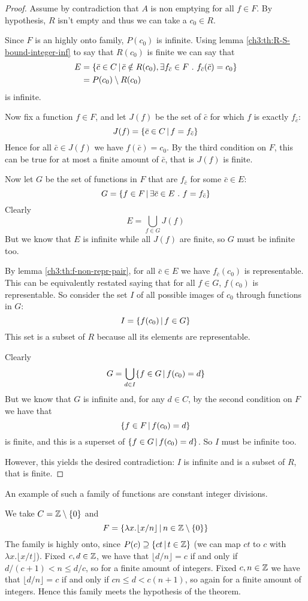 \begin{proof}
	Assume by contradiction that $A$ is non emptying for all $f \in F$. By hypothesis, $R$ isn't empty and thus we can take a $c_0 \in R$.
	
	Since $F$ is an highly onto family, $P(c_0)$ is infinite. Using lemma \ref{ch3:th:R-S-bound-integer-inf} to say that $R(c_0)$ is finite we can say that
	\begin{align*}
		E &= \{ \bar{c} \in C \,\vert\, \bar{c} \notin R(c_0), \exists f_{\bar{c}} \in F\ .\ f_{\bar{c}}(\bar{c}) = c_0 \} \\
		&= P(c_0) \setminus R(c_0)
	\end{align*}
	is infinite.

	Now fix a function $f \in F$, and let $J(f)$ be the set of $\bar{c}$ for which $f$ is exactly $f_{\bar{c}}$:
	\[
	J(f) = \{ \bar{c} \in C \,\vert\, f = f_{\bar{c}} \}
	\]
	Hence for all $\bar{c} \in J(f)$ we have $f(\bar{c}) = c_0$. By the third condition on $F$, this can be true for at most a finite amount of $\bar{c}$, that is $J(f)$ is finite.

	Now let $G$ be the set of functions in $F$ that are $f_{\bar{c}}$ for some $\bar{c} \in E$:
	\[
	G = \{ f \in F \,\vert\, \exists \bar{c} \in E\ .\ f = f_{\bar{c}} \}
	\]
	Clearly
	\[
	E = \bigcup\limits_{f \in G} J(f)
	\]
	But we know that $E$ is infinite while all $J(f)$ are finite, so $G$ must be infinite too.

	By lemma \ref{ch3:th:f-non-repr-pair}, for all $\bar{c} \in E$ we have $f_{\bar{c}}(c_0)$ is representable. This can be equivalently restated saying that for all $f \in G$, $f(c_0)$ is representable.
	So consider the set $I$ of all possible images of $c_0$ through functions in $G$:
	\[
	I = \{ f(c_0) \,\vert\, f \in G \}	
	\]
	This set is a subset of $R$ because all its elements are representable.
	
	Clearly
	\[
	G = \bigcup\limits_{d \in I} \{ f \in G \,\vert\, f(c_0) = d \}
	\]
	But we know that $G$ is infinite and, for any $d \in C$, by the second condition on $F$ we have that
	\[
	\{ f \in F \,\vert\, f(c_0) = d \}
	\]
	is finite, and this is a superset of $\{ f \in G \,\vert\, f(c_0) = d \}$. So $I$ must be infinite too.
	
	However, this yields the desired contradiction: $I$ is infinite and is a subset of $R$, that is finite.
\end{proof}

An example of such a family of functions are constant integer divisions.
\begin{example}
	We take $C = \mathbb{Z} \setminus \{ 0 \}$ and
	\[
	F = \{ \lambda x. \lfloor x / n \rfloor \,\vert\, n \in \mathbb{Z} \setminus \{ 0 \}\}
	\]
	The family is highly onto, since $P(c) \supseteq \{ ct \,\vert\, t \in \mathbb{Z} \}$ (we can map $ct$ to $c$ with $\lambda x. \lfloor x / t \rfloor$).
	Fixed $c, d \in \mathbb{Z}$, we have that $\lfloor d / n \rfloor = c$ if and only if $d / (c+1) < n \le d / c$, so for a finite amount of integers.
	Fixed $c, n \in \mathbb{Z}$ we have that $\lfloor d / n \rfloor = c$ if and only if $c n \le d < c (n + 1)$, so again for a finite amount of integers.
	Hence this family meets the hypothesis of the theorem.
\end{example}

